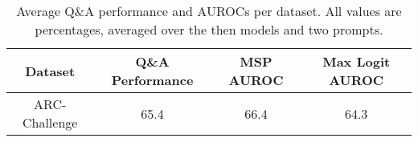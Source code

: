 \begin{table*}
\centering
\begin{tabular}{c|c|c|c}
Dataset & Q\&A Performance & MSP AUROC & Max Logit AUROC\\ \hline
ARC-Challenge & 65.4 & 66.4 & 64.3\\
\hline
\end{tabular}
\caption{Average Q\&A performance and AUROCs per dataset. All values are percentages, averaged over the then models and two prompts.}
\label{tab:dataset}
\end{table*}
